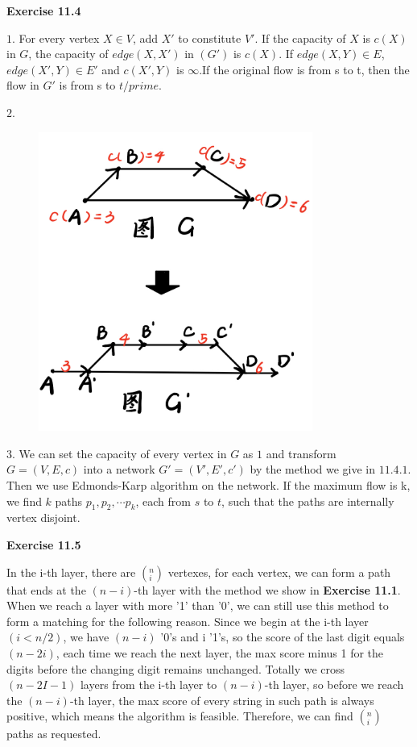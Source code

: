 \documentclass{article} %
\begin{document}
\textbf{Exercise 11.4}\par
    $1.$ For every vertex $X \in V$, add $X\prime$ to constitute $V\prime$. If the capacity of $X$ is $c(X)$ in $G$, the capacity of $edge(X,X\prime)$ in $(G\prime)$ is $c(X).$ If $edge(X,Y)\in E$, $edge(X\prime,Y)\in E\prime$ and $c(X\prime,Y)$ is $\infty$.If the original flow is from s to t, then the flow in $G\prime$ is from s to $t/prime$.\par
    $2.$
    \begin{figure}[H]
  	\centering
  	\includegraphics[width=9cm]{11_4_2.png}
  	\caption{}
  	\label{}
  	\end{figure}
    
    
    $3.$ We can set the capacity of every vertex in $G$ as $1$ and transform $G = (V,E,c)$ into a network $G\prime = (V\prime,E\prime,c\prime)$ by the method we give in $11.4.1$. Then we use Edmonds-Karp algorithm on the network. If the maximum flow is k, we find $k$ paths $p_1,p_2,\cdots p_k$, each from $s$ to $t$, such that the paths are internally vertex disjoint.\par

 \textbf{Exercise 11.5}\par	
	In the i-th layer, there are $(^n _i)$ vertexes, for each vertex, we can form a path that ends at the $(n-i)$-th layer with the method we show in \textbf{Exercise 11.1}. When we reach a layer with more '1' than '0', we can still use this method to form a matching for the following reason. Since we begin at the i-th layer$(i<n/2)$, we have $(n-i)$ '0's and i '1's, so the score of the last digit equals $(n-2i)$, each time we reach the next layer, the max score minus 1 for the  digits before the changing digit remains unchanged. Totally we cross $(n-2I-1)$ layers from the i-th layer to $(n-i)$-th layer, so before we reach the $(n-i)$-th layer, the max score of every string in such path is always positive, which means the algorithm is feasible. Therefore, we can find $(^n _i)$ paths as requested.\par
\end{document}
